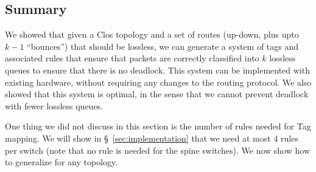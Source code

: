 \subsection {Summary}

We showed that given a Clos topology and a set of routes (up-down, plus
upto $k-1$ ``bounces'') that should be lossless, we can generate a system of
tags and associated rules that ensure that packets are correctly classified
into $k$ lossless queues to ensure that there is no deadlock.   This system can
be implemented with existing hardware, without requiring any changes to the
routing protocol. We also showed that this system is optimal, in the sense that
we cannot prevent deadlock with fewer lossless queues.

One thing we did not discuss in this section is the number of rules needed for Tag mapping. 
We will show in \S~\ref{sec:implementation} that we need at most 4 rules per switch 
(note that no rule is needed for the spine switches).
We now show how to generalize \sysname{} for any topology.

